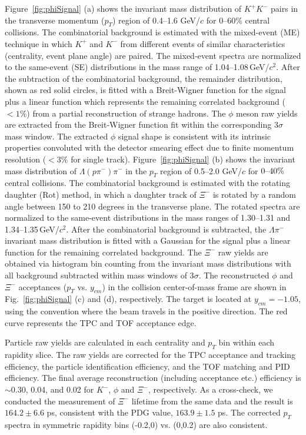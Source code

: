 \documentclass[aps,tightenlines,superscriptaddress,twocolumn]{revtex4-1}
\begin{document}
Figure~\ref{fig:phiSignal} (a) shows the invariant mass distribution of $K^+K^-$ pairs in the transverse momentum ($p_{T}$) region of 0.4--1.6 GeV/$c$ for 0--60\% central collisions. The combinatorial background is estimated with the mixed-event (ME) technique in which $K^+$ and $K^-$ from different events of similar characteristics (centrality, event plane angle) are paired. The mixed-event spectra are normalized to the same-event (SE) distributions in the mass range of 1.04--1.08\,GeV/$c^2$. After the subtraction of the combinatorial background, the remainder distribution, shown as red solid circles, 
is fitted with a Breit-Wigner function for the signal plus a linear function which represents the remaining correlated background ($< 1\%$) from a partial reconstruction of strange hadrons. The $\phi$ meson raw yields are extracted from the Breit-Wigner function fit within the corresponding 3$\sigma$ mass window. The extracted $\phi$ signal shape is consistent with its intrinsic properties convoluted with the detector smearing effect due to finite momentum resolution ($<3\%$ for single track).
Figure~\ref{fig:phiSignal} (b) shows the invariant mass distribution of $\Lambda(p\pi^-)\pi^-$ in the $p_{T}$ region of 0.5--2.0 GeV/$c$ for $\textup{0--40\%}$ central collisions. The combinatorial background is estimated with the rotating daughter (Rot) method, in which a daughter track of $\Xi^-$ is rotated by a random angle between 150 to 210 degrees in the transverse plane. The rotated spectra are normalized to the same-event distributions in the mass ranges of 1.30--1.31 and 1.34--1.35\,GeV/$c^2$. After the combinatorial background is subtracted, the $\Lambda\pi^-$ invariant mass distribution is fitted with a Gaussian for the signal plus a linear function for the remaining correlated background. The $\Xi^-$ raw yields are obtained via histogram bin counting from the invariant mass distributions with all background subtracted within mass windows of 3$\sigma$. The reconstructed $\phi$ and $\Xi^-$ acceptances ($p_T$ vs. $y_{cm}$) in the collision center-of-mass frame are shown in Fig.~\ref{fig:phiSignal} (c) and (d), respectively.
The target is located at $y_{cm} = -1.05$, using the convention where the beam travels in the positive direction. The red curve represents the TPC and TOF acceptance edge. %

Particle raw yields are calculated in each centrality and $p_{T}$ bin within each rapidity slice. 
The raw yields are corrected for the TPC acceptance and tracking efficiency, %
the particle identification efficiency, %
and the TOF matching and PID efficiency. The final average reconstruction (including acceptance etc.) efficiency is $\sim$0.30, 0.04, and 0.02 for $K^-$, $\phi$ and $\Xi^-$, respectively. As a cross-check, we conducted the measurement of $\Xi^{-}$ lifetime from the same data and the result is $164.2\pm6.6$ ps, consistent with the PDG value, $163.9\pm1.5$ ps. The corrected $p_T$ spectra in symmetric rapidity bins (-0.2,0) vs. (0,0.2) are also consistent.
\end{document}

